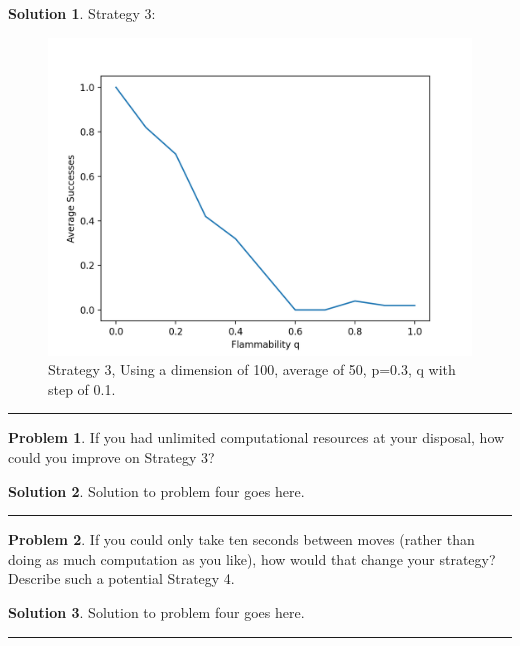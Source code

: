 \documentclass{article}
\theoremstyle{definition}
\newtheorem{problem}{Problem}
\def\fline{\rule{0.75\linewidth}{0.5pt}}
\newcommand{\finishline}{\vspace{-15pt}\begin{center}\fline\end{center}}
\newtheorem*{solution*}{Solution}
\newenvironment{solution}{\begin{solution*}}{{\finishline} \end{solution*}}
\begin{document}
\begin{solution}
    
    Strategy 3: 
    \begin{figure}[h]
    \centerline{\includegraphics{P6ST2.png}}
    \caption{Strategy 3, Using a dimension of 100, average of 50, p=0.3, q with step of 0.1.}
    \label{fig}
    \end{figure}
\end{solution}

\smallskip

\begin{problem}
	If you had unlimited computational resources at your disposal, how could you improve on Strategy 3?
\end{problem}

\smallskip

\begin{solution}
	Solution to problem four goes here. 
\end{solution}

\smallskip

\begin{problem}
	If you could only take ten seconds between moves (rather than doing as much computation as you like), how would that change your strategy? Describe such a potential Strategy 4.
\end{problem}

\smallskip

\begin{solution}
	Solution to problem four goes here. 
\end{solution}

\smallskip
\end{document}
